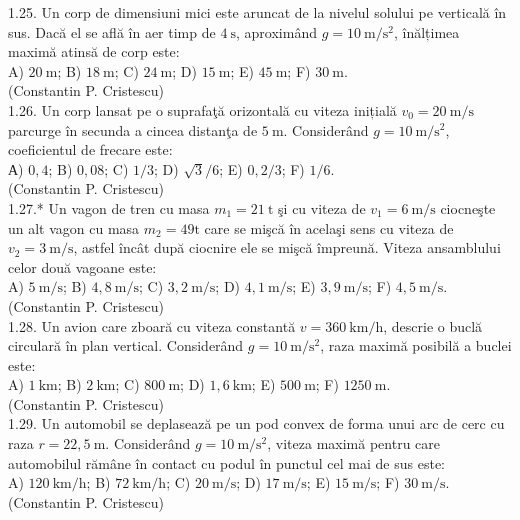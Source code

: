 1.25. Un corp de dimensiuni mici este aruncat de la nivelul solului pe verticală în sus. Dacă el se află în aer timp de $4 \mathrm{~s}$, aproximând $g=10 \mathrm{~m} / \mathrm{s}^{2}$, înălțimea maximă atinsă de corp este:\\ A) $20 \mathrm{~m}$; B) $18 \mathrm{~m}$; C) $24 \mathrm{~m}$; D) $15 \mathrm{~m}$; E) $45 \mathrm{~m}$; F) $30 \mathrm{~m}$.\\ (Constantin P. Cristescu)\\

1.26. Un corp lansat pe o suprafaţă orizontală cu viteza inițială $v_{0}=20 \mathrm{~m} / \mathrm{s}$ parcurge în secunda a cincea distanţa de $5 \mathrm{~m}$. Considerând $g=10 \mathrm{~m} / \mathrm{s}^{2}$, coeficientul de frecare este:\\ А) $0,4$; B) $0,08$; C) $1 / 3$; D) $\sqrt{3} / 6$; E) $0,2 / 3$; F) $1 / 6$.\\ (Constantin P. Cristescu)\\

1.27.* Un vagon de tren cu masa $m_{1}=21 \mathrm{~t}$ şi cu viteza de $v_{1}=6 \mathrm{~m} / \mathrm{s}$ ciocneşte un alt vagon cu masa $m_{2}=49 \mathrm{t}$ care se mişcă în acelaşi sens cu viteza de $v_{2}=3 \mathrm{~m} / \mathrm{s}$, astfel încât după ciocnire ele se mişcă împreună. Viteza ansamblului celor două vagoane este:\\ A) $5 \mathrm{~m} / \mathrm{s}$; B) $4,8 \mathrm{~m} / \mathrm{s}$; C) $3,2 \mathrm{~m} / \mathrm{s}$; D) $4,1 \mathrm{~m} / \mathrm{s}$; E) $3,9 \mathrm{~m} / \mathrm{s}$; F) $4,5 \mathrm{~m} / \mathrm{s}$.\\ (Constantin P. Cristescu)\\

1.28. Un avion care zboară cu viteza constantă $v=360 \mathrm{~km} / \mathrm{h}$, descrie o buclă circulară în plan vertical. Considerând $g=10 \mathrm{~m} / \mathrm{s}^{2}$, raza maximă posibilă a buclei este:\\ A) $1 \mathrm{~km}$; B) $2 \mathrm{~km}$; C) $800 \mathrm{~m}$; D) $1,6 \mathrm{~km}$; E) $500 \mathrm{~m}$; F) $1250 \mathrm{~m}$.\\ (Constantin P. Cristescu)\\

1.29. Un automobil se deplasează pe un pod convex de forma unui arc de cerc cu raza $r=22,5 \mathrm{~m}$. Considerând $g=10 \mathrm{~m} / \mathrm{s}^{2}$, viteza maximă pentru care automobilul rămâne în contact cu podul în punctul cel mai de sus este:\\ A) $120 \mathrm{~km} / \mathrm{h}$; B) $72 \mathrm{~km} / \mathrm{h}$; C) $20 \mathrm{~m} / \mathrm{s}$; D) $17 \mathrm{~m} / \mathrm{s}$; E) $15 \mathrm{~m} / \mathrm{s}$; F) $30 \mathrm{~m} / \mathrm{s}$.\\ (Constantin P. Cristescu)\\

